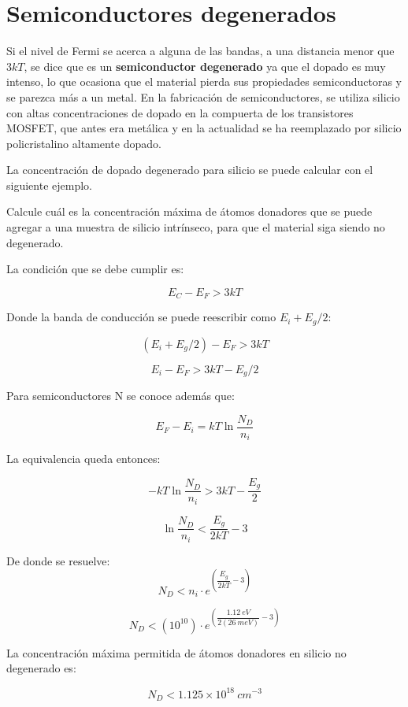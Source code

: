 
\newpage
\section{Semiconductores degenerados}

Si el nivel de Fermi se acerca a alguna de las bandas, a una distancia menor que $3kT$, se dice que es un \textbf{semiconductor degenerado} ya que el dopado es muy intenso, lo que ocasiona que el material pierda sus propiedades semiconductoras y se parezca más a un metal. En la fabricación de semiconductores, se utiliza silicio con altas concentraciones de dopado en la compuerta de los transistores MOSFET, que antes era metálica y en la actualidad se ha reemplazado por silicio policristalino altamente dopado.

La concentración de dopado degenerado para silicio se puede calcular con el siguiente ejemplo.

\begin{ejemplo}
Calcule cuál es la concentración máxima de átomos donadores que se puede agregar a una muestra de silicio intrínseco, para que el material siga siendo no degenerado.
\end{ejemplo}

\begin{solucion}
La condición que se debe cumplir es:

\[ E_C - E_F > 3kT \]

Donde la banda de conducción se puede reescribir como $E_i+E_g/2$:

\[ (E_i + E_g/2) - E_F > 3kT \]

\[ E_i - E_F > 3kT - E_g/2 \]

Para semiconductores N se conoce además que:

\[ E_F - E_i = kT \ln \dfrac{N_D}{n_i }\]

La equivalencia queda entonces:

\[ -kT \ln \dfrac{N_D}{n_i} > 3kT - \dfrac{E_g}{2} \]

\[ \ln \dfrac{N_D}{n_i} < \dfrac{E_g}{2kT} - 3 \]

De donde se resuelve:
\[ N_D < n_i \cdot e^{ \left( \dfrac{E_g}{2kT} - 3 \right) } \]

\[ N_D < (10^{10}) \cdot e^{ \left( \dfrac{1.12\ eV}{2(26\ meV)} - 3 \right) } \]

La concentración máxima permitida de átomos donadores en silicio no degenerado es:

\[ N_D < 1.125 \times 10^{18}\ cm^{-3} \]
\end{solucion}

